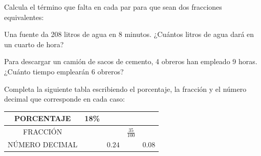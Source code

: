 \documentclass[addpoints,spanish, 12pt,a4paper]{exam}
\renewcommand*\half{.5}
\begin{document}
\begin{questions}



\question[1] Calcula el término que falta en cada par para que sean dos fracciones equivalentes:
\begin{multicols}{3}
\end{multicols}
\vspace{40pt}

\question[1\half] Una fuente da 208 litros de agua en 8 minutos. ¿Cuántos litros de agua dará en un cuarto de hora?

\vspace{3cm}

\question[1] Para descargar un camión de sacos de cemento, 4 obreros han empleado 9 horas. ¿Cuánto tiempo emplearán 6 obreros?

\vspace{3cm}

\question[1\half] Completa la siguiente tabla escribiendo el porcentaje, la fracción y el número decimal que corresponde en cada caso:
\begin{center}
    \begin{tabular}{|c|c|c|c|c|}
        \hline
        PORCENTAJE & 18\% & & & \\ \hline
        FRACCIÓN & & & $\frac{35}{100}$ & \\ \hline
        NÚMERO DECIMAL & & $0.24$ & & $0.08$ \\ \hline
    \end{tabular}
\end{center}


\end{questions}
\end{document}

